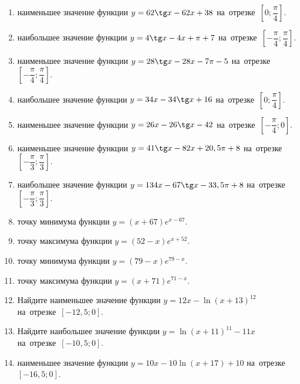 \documentclass[a4paper,10pt]{article}
\begin{document}
\begin{enumerate}
\item {} наименьшее значение функции $y = 62\tg x-62x+38$ на~отрезке~$\left[0;\dfrac{\pi }{4}\right]$.

\item {} наибольшее значение функции $y=4\tg x-4x+\pi +7$ на~отрезке~$\left[-\dfrac{\pi }{4};\dfrac{\pi }{4}\right]$.

\item {} наименьшее значение функции $y=28\tg x-28x-7\pi -5$ на~отрезке~$\left[-\dfrac{\pi }{4};\dfrac{\pi }{4}\right]$.

\item {} наибольшее значение функции $y = 34x-34\tg x +16$ на~отрезке~$\left[0;\dfrac{\pi }{4}\right]$.

\item {} наименьшее значение функции $y = 26x-26\tg x -42$ на~отрезке~$\left[-\dfrac{\pi }{4};0\right]$.

\item {} наименьшее значение функции $y = 41\tg x-82x+20,5 \pi +8$ на~отрезке~$\left[-\dfrac{\pi }{3};\dfrac{\pi }{3}\right]$.

\item {} наибольшее значение функции $y = 134x-67\tg x-33,5\pi +8$ на~отрезке~$\left[-\dfrac{\pi }{3};\dfrac{\pi }{3}\right]$.

\item {} точку минимума функции $y = \left(x+67\right)e^{x-67}$.

\item {} точку максимума функции $y = \left(52-x\right)e^{x+52}$.

\item {} точку минимума функции $y = \left(79-x\right)e^{79-x}$.

\item {} точку максимума функции $y = \left(x+71\right)e^{71-x}$.

\item Найдите наименьшее значение функции $y = 12x-\ln \left(x+13\right)^{12}$ на~отрезке~$\left[-12,5;0\right]$.

\item Найдите наибольшее значение функции $y = \ln \left(x+11\right)^{11}-11x$ на~отрезке~$\left[-10,5;0\right]$.

\item {} наименьшее значение функции $y = 10x-10\ln \left(x+17\right) +10$ на~отрезке~$\left[-16,5;0\right]$.


\end{enumerate}
\end{document}
